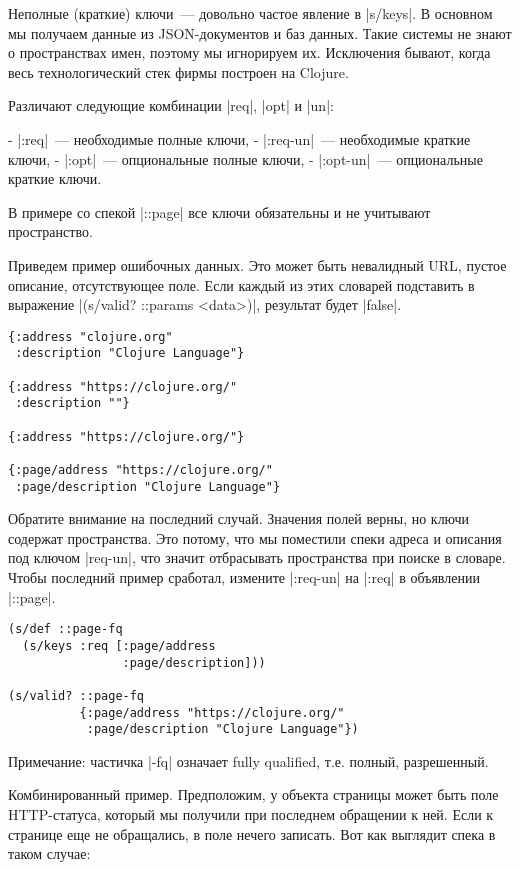 Неполные (краткие) ключи~--- довольно частое явление в \spverb|s/keys|. В основном мы
получаем данные из JSON-документов и баз данных. Такие системы не знают о
пространствах имен, поэтому мы игнорируем их. Исключения бывают, когда весь
технологический стек фирмы построен на Clojure.

Различают следующие комбинации \spverb|req|, \spverb|opt| и \spverb|un|:

- \spverb|:req|~--- необходимые полные ключи,
- \spverb|:req-un|~--- необходимые краткие ключи,
- \spverb|:opt|~--- опциональные полные ключи,
- \spverb|:opt-un|~--- опциональные краткие ключи.

В примере со спекой \spverb|::page| все ключи обязательны и не учитывают пространство.

Приведем пример ошибочных данных. Это может быть невалидный URL, пустое
описание, отсутствующее поле. Если каждый из этих словарей подставить в
выражение \spverb|(s/valid? ::params <data>)|, результат будет \spverb|false|.

\begin{verbatim}
{:address "clojure.org"
 :description "Clojure Language"}

{:address "https://clojure.org/"
 :description ""}

{:address "https://clojure.org/"}

{:page/address "https://clojure.org/"
 :page/description "Clojure Language"}
\end{verbatim}

Обратите внимание на последний случай. Значения полей верны, но ключи содержат
пространства. Это потому, что мы поместили спеки адреса и описания под ключом
\spverb|req-un|, что значит отбрасывать пространства при поиске в словаре. Чтобы
последний пример сработал, измените \spverb|:req-un| на \spverb|:req| в объявлении \spverb|::page|.

\begin{verbatim}
(s/def ::page-fq
  (s/keys :req [:page/address
                :page/description]))

(s/valid? ::page-fq
          {:page/address "https://clojure.org/"
           :page/description "Clojure Language"})
\end{verbatim}

Примечание: частичка \spverb|-fq| означает fully qualified, т.е. полный, разрешенный.

Комбинированный пример. Предположим, у объекта страницы может быть поле
HTTP-статуса, который мы получили при последнем обращении к ней. Если к странице
еще не обращались, в поле нечего записать. Вот как выглядит спека в таком
случае:

